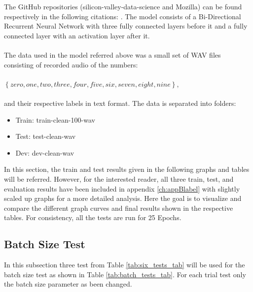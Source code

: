 The GitHub repositories (silicon-valley-data-science and Mozilla)
can be found respectively in the following citations:
\cite{rubashkin2017, mozilla2017}.
The model consists of a Bi-Directional Recurrent Neural Network
with three fully connected layers before it and a fully connected
layer with an activation layer after it.\\\\
The data used in the model referred above was a small set of WAV files consisting of recorded audio of the numbers:\\\\
$\left\{zero, one, two, three, four, five, six, seven, eight, nine \right\}$,\\\\
and their respective labels in text format. The data is separated into folders:
\begin{itemize}
    \item Train: train-clean-100-wav
    \item Test: test-clean-wav
    \item Dev: dev-clean-wav
\end{itemize}
In this section, the train and test results given in the following graphs and tables will be referred. However, for the interested
reader, all three train, test, and evaluation
results have been included in appendix \ref{ch:appBlabel} with slightly scaled up graphs for a more detailed analysis.
Here the goal is to visualize and compare the different graph curves and final results shown in the respective tables.
For consistency, all the tests are run for 25 Epochs. 

\subsection{Batch Size Test}
In this subsection three test from Table \ref{tab:six_tests_tab}  
will be used for the batch size test as shown in Table \ref{tab:batch_tests_tab}. For each trial test only the batch size parameter as been changed.

